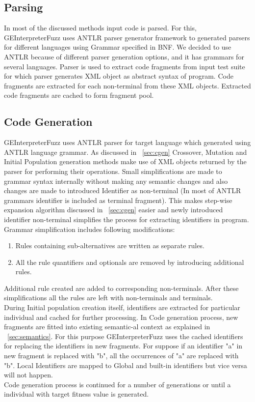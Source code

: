 \documentclass{sig-alternate}
\begin{document}
\subsection{Parsing}
\indent In most of the discussed methods input code is parsed. For this, GEInterpreterFuzz uses ANTLR parser generator framework to generated parsers for different languages using Grammar specified in BNF. We decided to use ANTLR because of different parser generation options, and it has grammars for several languages. 
Parser is used to extract code fragments from input test suite for which parser generates XML object as abstract syntax of program. Code fragments are extracted for each non-terminal from these XML objects. Extracted code fragments are cached to form fragment pool.

\subsection{Code Generation}
\indent GEInterpreterFuzz uses ANTLR parser for target language which generated using ANTLR language grammar. As discussed in ~\autoref{sec:cgen} Crossover, Mutation and Initial Population generation methods make use of XML objects returned by the parser for performing their operations. Small simplifications are made to grammar syntax internally without making any semantic changes and also changes are made to introduced Identifier as non-terminal (In most of ANTLR grammars identifier is included as terminal fragment). This makes step-wise expansion algorithm discussed in ~\autoref{sec:cgen} easier and newly introduced identifier non-terminal simplifies the process for extracting identifiers in program. 
\indent Grammar simplification includes following modifications:
\begin{enumerate}
\item Rules containing sub-alternatives are written as separate rules.
\item All the rule quantifiers and optionals are removed by introducing additional rules.
\end{enumerate}
Additional rule created are added to corresponding non-terminals. After these simplifications all the rules are left with non-terminals and terminals.\\
\indent During Initial population creation itself, identifiers are extracted for particular individual and cached for further processing. In Code generation process, new fragments are fitted into existing semantic-al context as explained in ~\autoref{sec:semantics}. For this purpose GEInterpreterFuzz uses the cached identifiers for replacing the identifiers in new fragments. For suppose if an identifier "a" in new fragment is replaced with "b", all the occurrences of "a" are replaced with "b". Local Identifiers are mapped to Global and built-in identifiers but vice versa will not happen.\\
\indent Code generation process is continued for a number of generations or until a individual with target fitness value is generated. 
\end{document}
